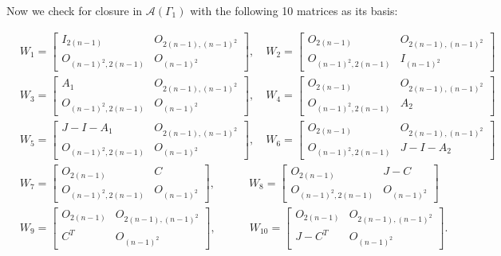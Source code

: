 Now we check for closure in $\mathcal{A}(\Gamma_1)$ with the following 10 matrices as its basis:

\begin{align*}
    &W_1 = \begin{bmatrix}
        I_{2(n-1)} & O_{2(n-1), (n-1)^2} \\
        O_{(n-1)^2, 2(n-1)} & O_{(n-1)^2}
    \end{bmatrix}, \quad
    W_2 = \begin{bmatrix}
        O_{2(n-1)} & O_{2(n-1), (n-1)^2} \\
        O_{(n-1)^2, 2(n-1)} & I_{(n-1)^2}
    \end{bmatrix}\\
    &W_3 = \begin{bmatrix}
        A_1 & O_{2(n-1), (n-1)^2} \\
        O_{(n-1)^2, 2(n-1)} & O_{(n-1)^2}
    \end{bmatrix}, \quad
    W_4 = \begin{bmatrix}
        O_{2(n-1)} & O_{2(n-1), (n-1)^2} \\
        O_{(n-1)^2, 2(n-1)} & A_2
    \end{bmatrix}\\
    &W_5 = \begin{bmatrix}
        J-I-A_1 & O_{2(n-1), (n-1)^2} \\
        O_{(n-1)^2, 2(n-1)} & O_{(n-1)^2}
    \end{bmatrix}, \quad
    W_6 = \begin{bmatrix}
        O_{2(n-1)} & O_{2(n-1), (n-1)^2} \\
        O_{(n-1)^2, 2(n-1)} & J-I-A_2
    \end{bmatrix}\\
    &W_7 = \begin{bmatrix}
        O_{2(n-1)} & C \\
        O_{(n-1)^2, 2(n-1)} & O_{(n-1)^2}
    \end{bmatrix}, \quad\quad\quad
    W_8 = \begin{bmatrix}
        O_{2(n-1)} & J-C \\
        O_{(n-1)^2, 2(n-1)} & O_{(n-1)^2}
    \end{bmatrix}\\
    &W_9 = \begin{bmatrix}
        O_{2(n-1)} & O_{2(n-1), (n-1)^2} \\
        C^T & O_{(n-1)^2}
    \end{bmatrix}, \quad\quad\quad
    W_{10} = \begin{bmatrix}
        O_{2(n-1)} & O_{2(n-1), (n-1)^2} \\
        J-C^T & O_{(n-1)^2}
    \end{bmatrix}.\\
\end{align*}

